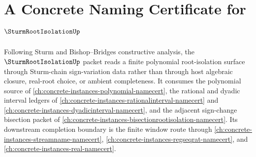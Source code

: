 \chapter{A Concrete Naming Certificate for $\SturmRootIsolationUp$}
\label{ch:concrete-instances-sturmrootisolation-namecert}

Following Sturm and Bishop--Bridges constructive analysis, the $\SturmRootIsolationUp$ packet reads a finite polynomial root-isolation surface through Sturm-chain sign-variation data rather than through host algebraic closure, real-root choice, or ambient completeness. It consumes the polynomial source of \autoref{ch:concrete-instances-polynomial-namecert}, the rational and dyadic interval ledgers of \autoref{ch:concrete-instances-rationalinterval-namecert} and \autoref{ch:concrete-instances-dyadicinterval-namecert}, and the adjacent sign-change bisection packet of \autoref{ch:concrete-instances-bisectionrootisolation-namecert}. Its downstream completion boundary is the finite window route through \autoref{ch:concrete-instances-streamname-namecert}, \autoref{ch:concrete-instances-regseqrat-namecert}, and \autoref{ch:concrete-instances-real-namecert}.

